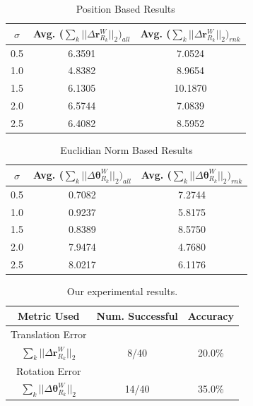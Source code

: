 \documentclass[10pt,twocolumn,letterpaper]{article}
\begin{document}
\begin{table}[h]
\begin{center}
\begin{tabular}{|c|c|c|}
\hline
$\sigma$ & Avg. ($ \sum_k || \Delta \boldsymbol{r}_{R_k}^W ||_2)_{all} $ & Avg. ($ \sum_k || \Delta \boldsymbol{r}_{R_k}^W ||_2)_{rnk} $ \\
\hline
0.5  & 6.3591  &  7.0524\\
\hline
1.0  &  4.8382 &  8.9654\\
\hline
1.5  &  6.1305 &  10.1870\\
\hline
2.0  &  6.5744 &  7.0839\\
\hline
2.5  &  6.4082 &  8.5952\\
\hline
\end{tabular}
\end{center}
\caption{Position Based Results}
\end{table}
\begin{table}[t]
\begin{center}
\begin{tabular}{|c|c|c|}
\hline
$\sigma$ & Avg. ($\sum_k || \Delta \boldsymbol{\theta}_{R_k}^W ||_2)_{all}$ & Avg. ($ \sum_k || \Delta \boldsymbol{\theta}_{R_k}^W ||_2)_{rnk}$\\
\hline
0.5  & 0.7082  &  7.2744\\
\hline
1.0  &  0.9237 &  5.8175\\
\hline
1.5  &  0.8389 &  8.5750\\
\hline
2.0  &  7.9474 &  4.7680\\
\hline
2.5  &  8.0217 &  6.1176\\
\hline
\end{tabular}
\end{center}
\caption{Euclidian Norm Based Results}
\end{table}

\begin{table}[h]
\begin{center}
\begin{tabular}{|c|c|c|}
\hline
Metric Used & Num. Successful & Accuracy  \\
\hline
 Translation Error &   &   \\
$ \sum_k || \Delta \boldsymbol{r}_{R_k}^W ||_2 $ & 8/40 & 20.0\% \\ 
\hline
Rotation Error &   &   \\
$ \sum_k || \Delta \boldsymbol{\theta}_{R_k}^W ||_2 $ & 14/40 & 35.0\% \\
\hline
\end{tabular}
\end{center}
\caption{Our experimental results.}
\end{table}
\end{document}
